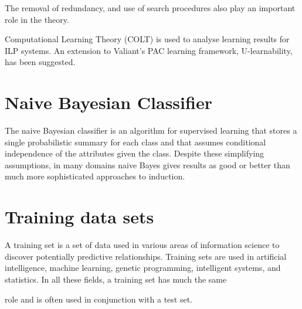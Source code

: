 \documentclass[11pt]{article} %
\begin{document}
The removal of redundancy, and use of search procedures also play an important role in the theory.


Computational Learning Theory (COLT) is used to analyse learning results for ILP systems. An extension to Valiant's PAC learning framework, U-learnability, has been suggested.



\section{Naive Bayesian Classifier}

The naive Bayesian classifier is an algorithm for supervised learning that stores a single probabilistic summary for each class and that assumes conditional independence of the attributes given the class. Despite these simplifying assumptions, in many domains naive Bayes gives results as good or better than much more sophisticated approaches to induction. 




\section{Training data sets}

A training set is a set of data used in various areas of information science to discover potentially predictive relationships. Training sets are used in artificial intelligence, machine learning, genetic programming, intelligent systems, and statistics. In all these fields, a training set has much the same 

role and is often used in conjunction with a test set.
\end{document}
